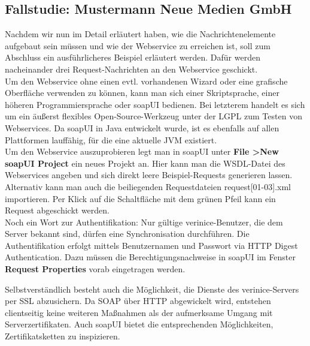 \documentclass[a4paper,10pt]{book}
\begin{document}
\subsection{ Fallstudie: Mustermann Neue Medien GmbH}
Nachdem wir nun im Detail erläutert haben, wie die Nachrichtenelemente aufgebaut sein müssen und wie der Webservice
zu erreichen ist, soll zum Abschluss ein ausführlicheres Beispiel erläutert werden. Dafür werden nacheinander drei
Request-Nachrichten an den Webservice geschickt.
\newline\\
Um den Webservice ohne einen evtl. vorhandenen Wizard oder eine grafische Oberfläche verwenden zu können, kann man
sich einer Skriptsprache, einer höheren Programmiersprache oder soapUI bedienen. Bei letzterem handelt es sich um ein äußerst flexibles Open-Source-Werkzeug unter der LGPL zum Testen von Webservices. Da soapUI in Java entwickelt wurde, ist es ebenfalls auf allen Plattformen lauffähig, für die eine aktuelle JVM existiert.
\newline\\
Um den Webservice auszuprobieren legt man in soapUI unter \textbf{File \textgreater New soapUI Project} ein
neues Projekt an. Hier kann man die WSDL-Datei des Webservices angeben und sich direkt leere Beispiel-Requests
generieren lassen. Alternativ kann man auch die beiliegenden Requestdateien request[01-03].xml importieren. Per Klick auf die Schaltfläche mit dem grünen Pfeil kann ein Request abgeschickt werden.
\newline\\
Noch ein Wort zur Authentifikation: Nur gültige verinice-Benutzer, die dem Server bekannt sind, dürfen eine
Synchronisation durchführen. Die Authentifikation erfolgt mittels Benutzernamen und Passwort via HTTP Digest
Authentication. Dazu müssen die Berechtigungsnachweise in soapUI im Fenster \textbf{Request Properties} vorab eingetragen
werden.

Selbstverständlich besteht auch die Möglichkeit, die Dienste des
verinice-Servers per SSL abzusichern. Da SOAP über HTTP abgewickelt wird,
entstehen clientseitig keine weiteren Maßnahmen als der aufmerksame Umgang mit
Serverzertifikaten. Auch soapUI bietet die entsprechenden Möglichkeiten,
Zertifikatsketten zu inspizieren.
\end{document}
